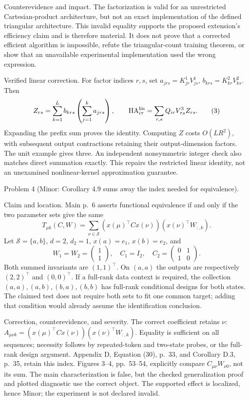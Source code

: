 \documentclass[10pt]{article}
\begin{document}
Counterevidence and impact. The factorization is valid for an unrestricted Cartesian-product architecture, but not an exact implementation of the defined triangular architecture. This invalid equality supports the proposed extension’s efficiency claim and is therefore material. It does not prove that a corrected efficient algorithm is impossible, refute the triangular-count training theorem, or show that an unavailable experimental implementation used the wrong expression.\par
Verified linear correction. For factor indices \(r,s\), set \(a_{jrs}=K^1_{jr}V^1_{js}\), \(b_{krs}=K^2_{kr}V^2_{ks}\). Then \[Z_{rs}=\sum_{k=1}^L b_{krs}\left(\sum_{j=1}^k a_{jrs}\right),
 \qquad
 \operatorname{HA}_{i\tau}^{\rm lin}
   =\sum_{r,s}Q_{ir}V^3_{\tau s}Z_{rs}.
 \tag{3}\] Expanding the prefix sum proves the identity. Computing \(Z\) costs \(O(LR^2)\), with subsequent output contractions retaining their output-dimension factors. The unit example gives three. An independent nonsymmetric integer check also matches direct summation exactly. This repairs the restricted linear identity, not an unexamined nonlinear-kernel approximation guarantee.\par
Problem 4 (Minor: Corollary 4.9 sums away the index needed for equivalence).\par
Claim and location. Main p. 6 asserts functional equivalence if and only if the two parameter sets give the same \[T_{\mu k}(C,W)=\sum_{\nu\in\mathcal S}
 (x(\mu)^\top Cx(\nu))(x(\nu)^\top W_{:,k}).\] Let \(\mathcal S=\{a,b\}\), \(d=2\), \(d_2=1\), \(x(a)=e_1\), \(x(b)=e_2\), and \[W_1=W_2=\begin{pmatrix}1\\1\end{pmatrix},\quad
 C_1=I_2,\quad C_2=\begin{pmatrix}0&1\\1&0\end{pmatrix}.\] Both summed invariants are \((1,1)^\top\). On \((a,a)\) the outputs are respectively \((2,2)^\top\) and \((0,0)^\top\). If a full-rank data context is required, the collection \((a,a),(a,b),(b,a),(b,b)\) has full-rank conditional designs for both states. The claimed test does not require both sets to fit one common target; adding that condition would already assume the identification conclusion.\par
Correction, counterevidence, and severity. The correct coefficient retains \(\nu\): \(A_{\mu\nu k}=(x(\mu)^\top Cx(\nu))(x(\nu)^\top W_{:,k})\). Equality is sufficient on all sequences; necessity follows by repeated-token and two-state probes, or the full-rank design argument. Appendix D, Equation (30), p. 33, and Corollary D.3, p. 35, retain this index. Figures 3–4, pp. 53–54, explicitly compare \(C_{\mu\nu}W_{\nu0}\), not its sum. The main characterization is false, but the checked generalization proof and plotted diagnostic use the correct object. The supported effect is localized, hence Minor; the experiment is not declared invalid.\par
\end{document}
